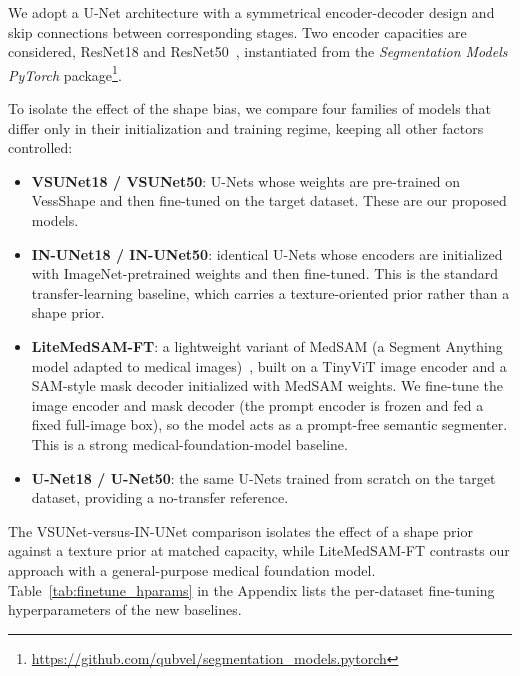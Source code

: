 \documentclass[twocolumn]{article}
\begin{document}
We adopt a U-Net architecture with a symmetrical encoder-decoder design and skip connections between corresponding stages. Two encoder capacities are considered, ResNet18 and ResNet50~\cite{he2016deep}, instantiated from the \textit{Segmentation Models PyTorch} package\footnote{\url{https://github.com/qubvel/segmentation_models.pytorch}}.

To isolate the effect of the shape bias, we compare four families of models that differ only in their initialization and training regime, keeping all other factors controlled:
\begin{itemize}
    \item \textbf{VSUNet18 / VSUNet50}: U-Nets whose weights are pre-trained on VessShape and then fine-tuned on the target dataset. These are our proposed models.
    \item \textbf{IN-UNet18 / IN-UNet50}: identical U-Nets whose encoders are initialized with ImageNet-pretrained weights and then fine-tuned. This is the standard transfer-learning baseline, which carries a texture-oriented prior rather than a shape prior.
    \item \textbf{LiteMedSAM-FT}: a lightweight variant of MedSAM (a Segment Anything model adapted to medical images)~\cite{ma2024medsam}, built on a TinyViT image encoder and a SAM-style mask decoder initialized with MedSAM weights. We fine-tune the image encoder and mask decoder (the prompt encoder is frozen and fed a fixed full-image box), so the model acts as a prompt-free semantic segmenter. This is a strong medical-foundation-model baseline.
    \item \textbf{U-Net18 / U-Net50}: the same U-Nets trained from scratch on the target dataset, providing a no-transfer reference.
\end{itemize}

The VSUNet-versus-IN-UNet comparison isolates the effect of a shape prior against a texture prior at matched capacity, while LiteMedSAM-FT contrasts our approach with a general-purpose medical foundation model. Table~\ref{tab:finetune_hparams} in the Appendix lists the per-dataset fine-tuning hyperparameters of the new baselines.


\end{document}
